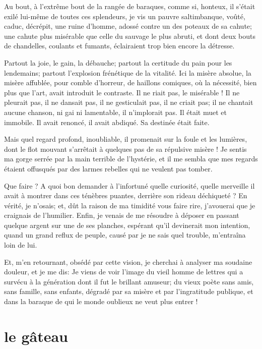 Au bout, à l’extrême bout de la rangée de baraques,
comme si, honteux, il s’était exilé lui{}-même de
toutes ces splendeurs, je vis un pauvre saltimbanque, voûté, caduc,
décrépit, une ruine d’homme, adossé contre un des
poteaux de sa cahute; une cahute plus misérable que celle du sauvage le
plus abruti, et dont deux bouts de chandelles, coulants et fumants,
éclairaient trop bien encore la détresse.

Partout la joie, le gain, la débauche; partout la certitude du pain pour
les lendemains; partout l’explosion frénétique de la
vitalité. Ici la misère absolue, la misère affublée, pour comble
d’horreur, de haillons comiques, où la nécessité, bien
plus que l’art, avait introduit le contraste. Il ne
riait pas, le misérable ! Il ne pleurait pas, il ne dansait pas, il ne
gesticulait pas, il ne criait pas; il ne chantait aucune chanson, ni
gai ni lamentable, il n’implorait pas. Il était muet
et immobile. Il avait renoncé, il avait abdiqué. Sa destinée était
faite.

Mais quel regard profond, inoubliable, il promenait sur la foule et les
lumières, dont le flot mouvant s’arrêtait à quelques
pas de sa répulsive misère ! Je sentis ma gorge serrée par la main
terrible de l’hystérie, et il me sembla que mes
regards étaient offusqués par des larmes rebelles qui ne veulent pas
tomber.

Que faire ? A quoi bon demander à l’infortuné quelle
curiosité, quelle merveille il avait à montrer dans ces ténèbres
puantes, derrière son rideau déchiqueté ? En vérité, je
n’osais; et, dût la raison de ma timidité vous faire
rire, j’avouerai que je craignais de
l’humilier. Enfin, je venais de me résoudre à déposer
en passant quelque argent sur une de ses planches, espérant
qu’il devinerait mon intention, quand un grand reflux
de peuple, causé par je ne sais quel trouble,
m’entraîna loin de lui.

Et, m’en retournant, obsédé par cette vision, je
cherchai à analyser ma soudaine douleur, et je me dis: Je viens de voir
l’image du vieil homme de lettres qui a survécu à la
génération dont il fut le brillant amuseur; du vieux poète sans amis,
sans famille, sans enfants, dégradé par sa misère et par
l’ingratitude publique, et dans la baraque de qui le
monde oublieux ne veut plus entrer !

\quebra\section[Le gâteau]{le gâteau}

